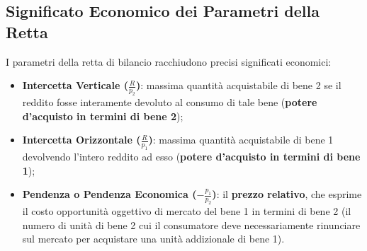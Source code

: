 \subsection{Significato Economico dei Parametri della Retta}
I parametri della retta di bilancio racchiudono precisi significati economici:
\begin{itemize}
    \item \textbf{Intercetta Verticale ($\frac{R}{p_2}$)}: massima quantità acquistabile di bene 2 se il reddito fosse interamente devoluto al consumo di tale bene (\textbf{potere d'acquisto in termini di bene 2});
    \item \textbf{Intercetta Orizzontale ($\frac{R}{p_1}$)}: massima quantità acquistabile di bene 1 devolvendo l'intero reddito ad esso (\textbf{potere d'acquisto in termini di bene 1});
    \item \textbf{Pendenza o Pendenza Economica ($-\frac{p_1}{p_2}$)}: il \textbf{prezzo relativo}, che esprime il costo opportunità oggettivo di mercato del bene 1 in termini di bene 2 (il numero di unità di bene 2 cui il consumatore deve necessariamente rinunciare sul mercato per acquistare una unità addizionale di bene 1).
\end{itemize}

